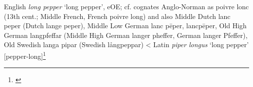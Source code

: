 \begin{etymology}\label{ety:long pepper}
English \textit{long pepper} `long pepper', eOE; cf. cognates Anglo-Norman as poivre lonc (13th cent.; Middle French, French poivre long) and also Middle Dutch lanc peper (Dutch lange peper), Middle Low German lanc pēper, lancpēper, Old High German langpfeffar (Middle High German langer pheffer, German langer Pfeffer), Old Swedish langa pipar (Swedish långpeppar)
< Latin \textit{piper longus} `long pepper' [pepper-long]\footnote{\textcite[long pepper]{oed}}
\end{etymology}